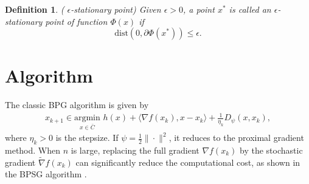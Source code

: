 \documentclass[letterpaper]{article} %
\newtheorem{definition}{Definition}
\begin{document}
	\begin{definition} \label{stationary-point}
		(\cite{Lan2020First} $\epsilon$-stationary point)
		Given $\epsilon>0$, a point $x^{*}$ is called an $\epsilon$-stationary point of function $\Phi(x)$ if
		\[
		\mbox{dist}(0,\partial \Phi(x^{*}))\le\epsilon.
		\]
	\end{definition}

	\section{Algorithm}\label{algorithm}
	The classic BPG algorithm \cite{BolteSTV18First}  is given by
	\begin{align*}
		x_{k+1}\in\underset{x\in\bar{C}}{\text{argmin}} \,\, h(x)+\langle \nabla f(x_{k}),x-x_{k}\rangle +\frac{1}{\eta_{k}}D_{\psi}(x,x_{k}),
	\end{align*}
	where $\eta_{k}>0$ is the stepsize. If $\psi=\frac{1}{2}\|\cdot\|^{2}$, it reduces to  the   proximal gradient method.
	When $n$ is large, replacing the full gradient $\nabla f(x_{k})$   by the stochastic gradient $\tilde{\nabla}f(x_{k})$ can significantly reduce the computational cost, as shown in the BPSG algorithm \cite{WangH23}.
\end{document}
